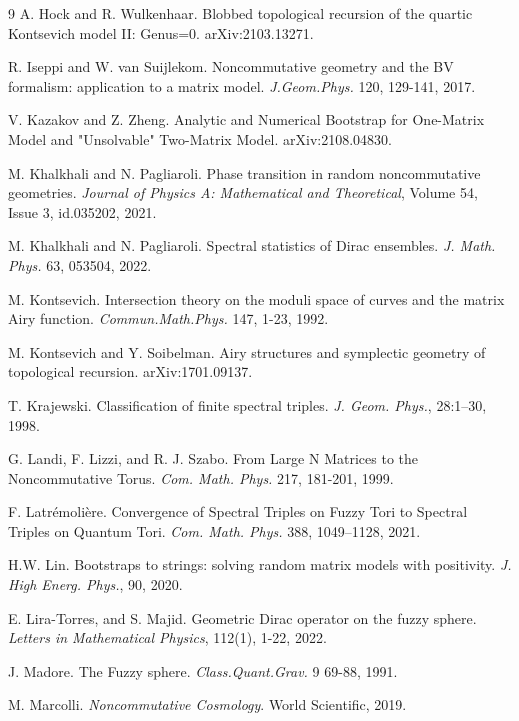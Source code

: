 \documentclass[10pt]{article}
\begin{document}
\begin{thebibliography}{9}
A. Hock and R. Wulkenhaar. Blobbed topological recursion of the quartic Kontsevich model II: Genus=0. 	arXiv:2103.13271.

R. Iseppi and  W. van Suijlekom. Noncommutative geometry and the BV formalism: application to a matrix model.  \textit{J.Geom.Phys.} 120, 129-141, 2017.



V. Kazakov and  Z. Zheng. Analytic and Numerical Bootstrap for One-Matrix Model and "Unsolvable" Two-Matrix Model. arXiv:2108.04830.

M. Khalkhali and N. Pagliaroli. Phase transition in random noncommutative geometries. \textit{Journal of Physics A: Mathematical and Theoretical}, Volume 54, Issue 3, id.035202, 2021.

M. Khalkhali and N. Pagliaroli. Spectral statistics of Dirac ensembles. \textit{J. Math. Phys.} 63, 053504, 2022.

M. Kontsevich. Intersection theory on the moduli space of curves and the matrix Airy function. \textit{Commun.Math.Phys.} 147, 1-23, 1992.

M. Kontsevich and Y. Soibelman. Airy structures and symplectic geometry of topological recursion. 	arXiv:1701.09137.

T.  Krajewski. Classification of finite spectral triples. \textit{J. Geom. Phys.}, 28:1–30, 1998.

G. Landi, F. Lizzi, and R. J. Szabo. From Large N Matrices to the Noncommutative Torus. \textit{Com. Math. Phys.} 217, 181-201, 1999.

F. Latr\'emoli\`ere. Convergence of Spectral Triples on Fuzzy Tori to Spectral Triples on Quantum Tori. \textit{Com. Math. Phys.} 388, 1049–1128, 2021.


H.W. Lin. Bootstraps to strings: solving random matrix models with positivity. \textit{J. High Energ. Phys.}, 90, 2020. 

E. Lira-Torres, and S. Majid. Geometric Dirac operator on the fuzzy sphere. \textit{Letters in Mathematical Physics}, 112(1), 1-22, 2022.

J. Madore. The Fuzzy sphere. \textit{Class.Quant.Grav.} 9 69-88, 1991.

M. Marcolli. {\it Noncommutative Cosmology}. World Scientific, 2019. 


\end{thebibliography}
\end{document}
